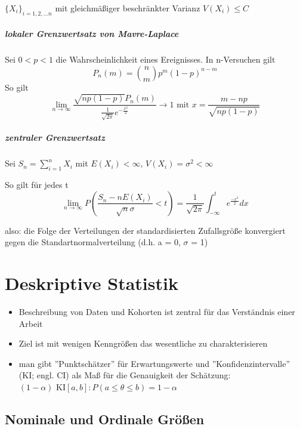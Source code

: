 \documentclass[10pt]{report}
\theoremstyle{definition}
\begin{document}
$\{X_i\}_{i=1,2, \ldots n}$ mit gleichmäßiger beschränkter Varianz  $V(X_i) \leq C$


\paragraph{lokaler Grenzwertsatz von Mavre-Laplace}
Sei $0<p<1$ die Wahrscheinlichkeit eines Ereignisses.
In n-Versuchen gilt
\[P_n (m) = \binom{n}{m} p^m(1-p)^{n-m}\] So gilt \[\lim\limits_{n \to \infty} \frac{\sqrt{np(1-p)} P_n(m)}{\frac{1}{\sqrt{2 \pi}} e ^{-\frac{x^2}{2}}} \rightarrow  1 \text{ mit } x=\frac{m-np}{\sqrt{np(1-p)}}\]

\paragraph{zentraler Grenzwertsatz}

Sei $S_n =  \sum_{i=1}^{n} X_i$ mit $E(X_i)<\infty$, $V(X_i) = \sigma ^2 < \infty$

So gilt für jedes t
\[ \lim\limits_{n \rightarrow \infty} P(\frac{S_n - n E(X_i)}{\sqrt{n} \sigma}< t) = \frac{1}{\sqrt{2\pi} }\int_{-\infty}^{t} e^{\frac{-x^2}{2}} dx
\]

also: die Folge der Verteilungen der standardisierten Zufallsgröße konvergiert gegen die Standartnormalverteilung (d.h. a = 0, $\sigma$ = 1)


\chapter{Deskriptive Statistik}

\begin{itemize}
	\item Beschreibung von Daten und Kohorten ist zentral für das Verständnis einer Arbeit
	\item Ziel ist mit wenigen Kenngrößen das wesentliche zu charakterisieren 
	\item man gibt ''Punktschätzer''  für Erwartungswerte und ''Konfidenzintervalle'' (KI; engl. CI) als Maß für die Genauigkeit der Schätzung:\\
	$(1- \alpha) \text{ KI} [a,b] : P(a \leq \theta \leq b) = 1-\alpha$
\end{itemize}


\section{Nominale und Ordinale Größen}
\end{document}
